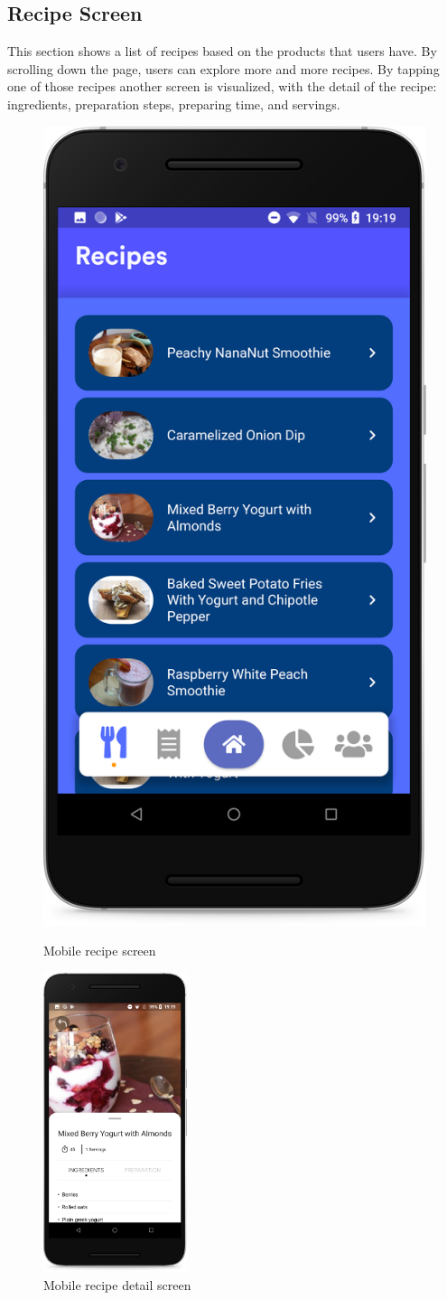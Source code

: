 \subsection{Recipe Screen}
This section shows a list of recipes based on the products that users have.
By scrolling down the page, users can explore more and more recipes.
By tapping one of those recipes another screen is visualized, with the detail of the recipe: ingredients, preparation steps, preparing time, and servings.\newline

\vspace*{-0.3cm}
\begin{figure}[H]
  \begin{minipage}{0.5\textwidth}
  \centering
    \includegraphics[width=42.mm,scale=0.9]{./Images//Mobile_mocks/recipe1.png}
    \vspace*{-0.3cm}
    \caption{Mobile recipe screen}
    \end{minipage}
\hfill
   \begin{minipage}{0.5\textwidth}
     \centering
     \includegraphics[width=42mm,scale=0.9]{./Images//Mobile_mocks/recipe2.png}
     \vspace*{-0.3cm}
     \caption{Mobile recipe detail screen}
   \end{minipage}
\end{figure}